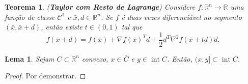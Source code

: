 \documentclass[12pt,a4paper]{scrartcl}
\DeclareMathOperator{\interior}{int}
\def\RR{\mathds{R}}
\def\xbar{\bar{x}}
\newtheorem{teo}{Teorema}
\newtheorem{lema}{Lema}
\theoremstyle{definition}%
\begin{document}
\begin{teo}(\textbf{Taylor com Resto de Lagrange}) {\cite[p.26]{Ademir2013}} \label{teo:Taylor_com_resto_lagrange}
Considere $f: \RR^{n} \rightarrow \RR$ uma função de classe $\mathcal{C}^{1}$ e $\xbar, d \in \RR^{n}$. Se $f$ é duas vezes diferenciável no segmento $(\xbar , \xbar + d)$, então existe $t \in (0,1)$ tal que
\[
f(\xbar + d) = f(\xbar) + \nabla f(\xbar)^{T} d + \dfrac{1}{2}d^{T}\nabla^{2} f(\xbar + td)d .
\]
\end{teo}


\begin{lema} \label{lema:auxiliar_para_teo_hessiana_convexidade}
Sejam $C \subset \RR^{n}$ convexo, $x \in \bar{C}$ e $y \in \interior C$. Então, $(x,y] \subset \interior C$.
\end{lema}
\begin{proof}
Por demonstrar.
\end{proof}
\end{document}
